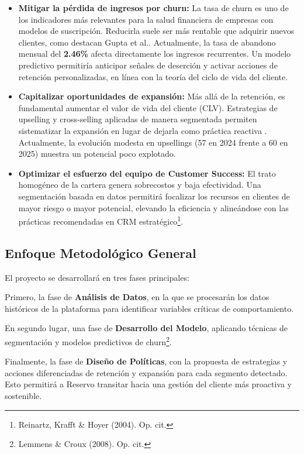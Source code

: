 \begin{itemize}
    \item \textbf{Mitigar la pérdida de ingresos por churn:} La tasa de churn es uno de los indicadores más relevantes para la salud financiera de empresas con modelos de suscripción. Reducirla suele ser más rentable que adquirir nuevos clientes, como destacan Gupta et al.\citep{Gupta2006}. Actualmente, la tasa de abandono mensual del \textbf{2.46\%} afecta directamente los ingresos recurrentes. Un modelo predictivo permitiría anticipar señales de deserción y activar acciones de retención personalizadas, en línea con la teoría del ciclo de vida del cliente\citep{Lemmens2008}.

    \item \textbf{Capitalizar oportunidades de expansión:} Más allá de la retención, es fundamental aumentar el valor de vida del cliente (CLV). Estrategias de upselling y cross-selling aplicadas de manera segmentada permiten sistematizar la expansión en lugar de dejarla como práctica reactiva \citep{Kumar2010}. Actualmente, la evolución modesta en upsellings (57 en 2024 frente a 60 en 2025) muestra un potencial poco explotado.

    \item \textbf{Optimizar el esfuerzo del equipo de Customer Success:} El trato homogéneo de la cartera genera sobrecostos y baja efectividad. Una segmentación basada en datos permitirá focalizar los recursos en clientes de mayor riesgo o mayor potencial, elevando la eficiencia y alineándose con las prácticas recomendadas en CRM estratégico\footnote{Reinartz, Krafft \& Hoyer (2004). Op. cit.}.
\end{itemize}

\subsection{Enfoque Metodológico General}

El proyecto se desarrollará en tres fases principales:  

Primero, la fase de \textbf{Análisis de Datos}, en la que se procesarán los datos históricos de la plataforma para identificar variables críticas de comportamiento.  

En segundo lugar, una fase de \textbf{Desarrollo del Modelo}, aplicando técnicas de segmentación y modelos predictivos de churn\footnote{Lemmens \& Croux (2008). Op. cit.}.  

Finalmente, la fase de \textbf{Diseño de Políticas}, con la propuesta de estrategias y acciones diferenciadas de retención y expansión para cada segmento detectado. Esto permitirá a Reservo transitar hacia una gestión del cliente más proactiva y sostenible.
 
